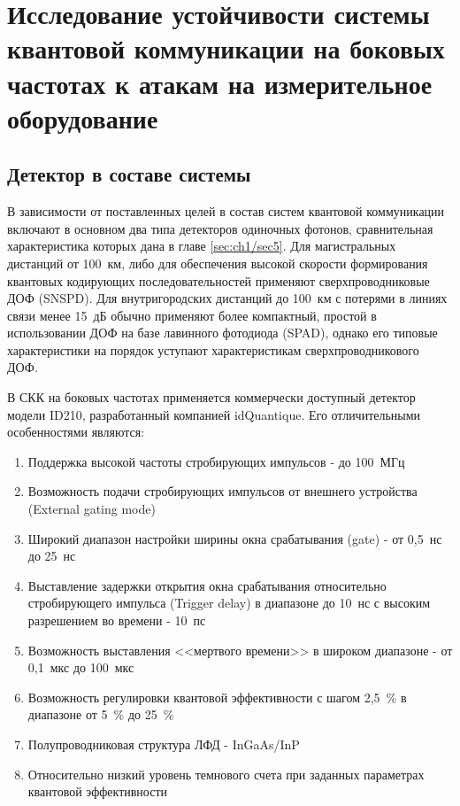 \chapter{Исследование устойчивости системы квантовой коммуникации на боковых частотах к атакам на измерительное оборудование}  \label{ch:ch2}


\section{Детектор в составе системы} \label{sec:ch2/sec1}

В зависимости от поставленных целей в состав систем квантовой коммуникации включают в основном два типа детекторов одиночных фотонов, сравнительная характеристика которых дана в главе \ref{sec:ch1/sec5}. Для магистральных дистанций от 100~км, либо для обеспечения высокой скорости формирования квантовых кодирующих последовательностей применяют сверхпроводниковые ДОФ (SNSPD). Для внутригородских дистанций до 100~км с потерями в линиях связи менее 15~дБ обычно применяют более компактный, простой в использовании ДОФ на базе лавинного фотодиода (SPAD), однако его типовые характеристики на порядок уступают характеристикам сверхпроводникового ДОФ. 


В СКК на боковых частотах применяется коммерчески доступный детектор модели ID210, разработанный компанией idQuantique. Его отличительными особенностями являются:
\begin{enumerate}
	\item Поддержка высокой частоты стробирующих импульсов - до 100~МГц
	\item Возможность подачи стробирующих импульсов от внешнего устройства (External gating mode)
	\item Широкий диапазон настройки ширины окна срабатывания (gate) - от 0,5~нс до 25~нс
	\item Выставление задержки открытия окна срабатывания относительно стробирующего импульса (Trigger delay) в диапазоне до 10~нс с высоким разрешением во времени - 10~пс 
	\item Возможность выставления <<мертвого времени>> в широком диапазоне - от 0,1~мкс до 100~мкс
	\item Возможность регулировки квантовой эффективности с шагом 2,5~\% в диапазоне от 5~\% до 25~\%
	\item Полупроводниковая структура ЛФД - InGaAs/InP
	\item Относительно низкий уровень темнового счета при заданных параметрах квантовой эффективности
\end{enumerate}


